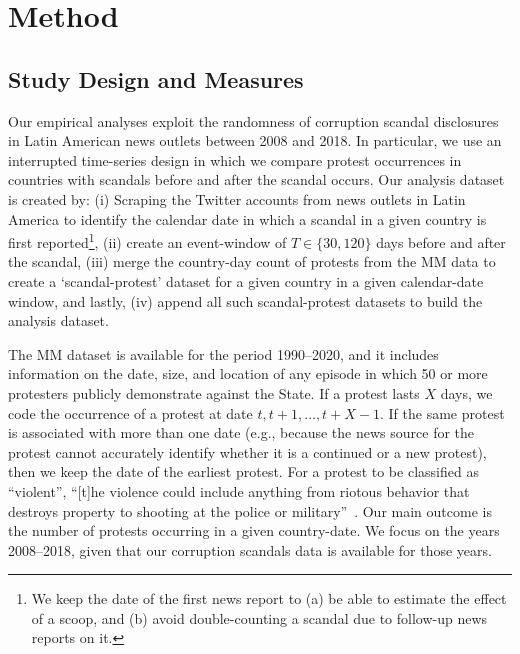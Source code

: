 \documentclass[11pt]{article}
\begin{document}
\section{Method}\label{sec:methods}
\subsection{Study Design and Measures}

Our empirical analyses exploit the randomness of corruption scandal disclosures in Latin American news outlets between 2008 and 2018. In particular, we use an interrupted time-series design in which we compare protest occurrences in countries with scandals before and after the scandal occurs. Our analysis dataset is created by: (i) Scraping the Twitter accounts from news outlets in Latin America to identify the calendar date in which a scandal in a given country is first reported\footnote{We keep the date of the first news report to (a) be able to estimate the effect of a scoop, and (b) avoid double-counting a scandal due to follow-up news reports on it.}, (ii) create an event-window of $T \in \{30, 120\}$ days before and after the scandal, (iii) merge the country-day count of protests from the MM data to create a `scandal-protest' dataset for a given country in a given calendar-date window, and lastly, (iv) append all such scandal-protest datasets to build the analysis dataset.

The MM dataset is available for the period 1990--2020, and it includes information on the date, size, and location of any episode in which 50 or more protesters publicly demonstrate against the State. If a protest lasts $X$ days, we code the occurrence of a protest at date $t, t+1, \dots, t+X-1$. If the same protest is associated with more than one date (e.g., because the news source for the protest cannot accurately identify whether it is a continued or a new protest), then we keep the date of the earliest protest. For a protest to be classified as ``violent'', ``[t]he violence could include anything from riotous behavior that destroys property to shooting at the police or military''~\citep{clark2016mass}. Our main outcome is the number of protests occurring in a given country-date. We focus on the years 2008--2018, given that our corruption scandals data is available for those years.
\end{document}
